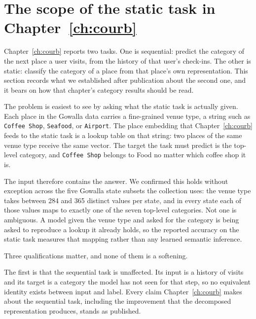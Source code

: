
\section{The scope of the static task in Chapter~\ref{ch:courb}}
\label{apx:errata:static-scope}

Chapter~\ref{ch:courb} reports two tasks. One is sequential: predict the category of the
next place a user visits, from the history of that user's check-ins. The other is static:
classify the category of a place from that place's own representation. This section
records what we established after publication about the second one, and it bears on how
that chapter's category results should be read.

The problem is easiest to see by asking what the static task is actually given. Each place in the
Gowalla data carries a fine-grained venue type, a string such as \texttt{Coffee Shop},
\texttt{Seafood}, or \texttt{Airport}. The place embedding that Chapter~\ref{ch:courb} feeds to the
static task is a lookup table on that string: two places of the same venue type receive the same
vector. The target the task must predict is the top-level category, and \texttt{Coffee Shop} belongs
to Food no matter which coffee shop it is.

The input therefore contains the answer. We confirmed this holds without exception across the five
Gowalla state subsets the collection uses: the venue type takes between 284 and 365 distinct values
per state, and in every state each of those values maps to exactly one of the seven top-level
categories. Not one is ambiguous. A model given the venue type and asked for the category is being
asked to reproduce a lookup it already holds, so the reported accuracy on the static task measures
that mapping rather than any learned semantic inference.

Three qualifications matter, and none of them is a softening.

The first is that the sequential task is unaffected. Its input is a history of visits and
its target is a category the model has not seen for that step, so no equivalent identity
exists between input and label. Every claim Chapter~\ref{ch:courb} makes about the
sequential task, including the improvement that the decomposed representation produces,
stands as published.

